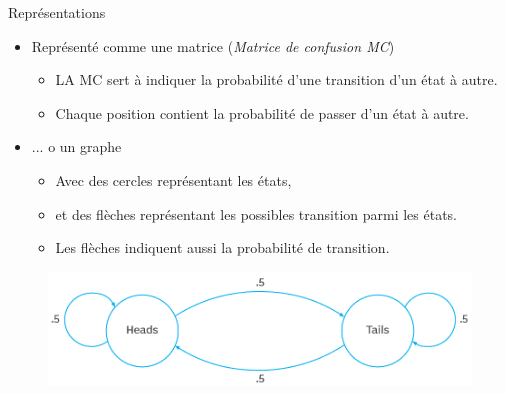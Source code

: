 \documentclass[aspectratio=169,xcolor=dvipsnames, t]{beamer}
\begin{document}
\begin{frame}{Représentations}
	\begin{itemize}
		\item Représenté comme une matrice (\textit{Matrice de confusion MC})
		\begin{itemize}
			\item LA MC sert à indiquer la probabilité d'une transition d'un état à autre.
			\item Chaque position contient la probabilité de passer d'un état à autre.
		\end{itemize} 
		\item ... o un graphe
		\begin{itemize}
			\item Avec des cercles représentant les états,
			\item et des flèches représentant les possibles transition parmi les états.
			\item Les flèches indiquent aussi la probabilité de transition.
		\end{itemize} 
	\end{itemize}
	\begin{figure}
		\includegraphics[height=0.25\paperheight]{figures/markov_chain_coin_toss-f.png}
	\end{figure}
	
\end{frame}
\end{document}
